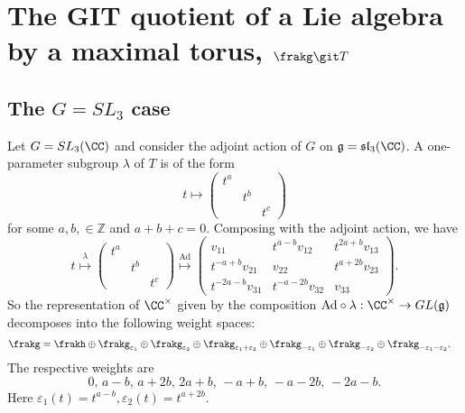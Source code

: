 \newpage
\section{The GIT quotient of a Lie algebra by a maximal torus, $\frakg \git T$}
\subsection{The $G=SL_3$ case}
Let $G = SL_3(\CC)$ and consider the adjoint action of $G$ on $\mathfrak{g} = \mathfrak{sl}_3(\CC)$.
A one-parameter subgroup $\lambda$ of $T$ is of the form
$$t \mapsto \begin{pmatrix} t^a & & \\ & t^b & \\ & & t^c \end{pmatrix}$$
for some $a, b, \in \mathbb{Z}$ and $a + b + c = 0$.
Composing with the adjoint action, we have
$$t 
\overset{\lambda}{\mapsto} \begin{pmatrix} t^a & & \\ & t^b & \\ & & t^c \end{pmatrix}
 \overset{\mathrm{Ad}}{\mapsto} \begin{pmatrix} v_{11} & t^{a-b} v_{12} & t^{2a+b} v_{13} \\ t^{-a+b} v_{21} & v_{22} & t^{a+2b} v_{23} \\ t^{-2a-b} v_{31} & t^{-a-2b} v_{32} & v_{33} \end{pmatrix}.$$
So the representation of $\CC^\times$ given by the composition $\mathrm{Ad} \circ \lambda: \CC^\times \to GL(\mathfrak{g})$ decomposes into the following weight spaces:
\begin{align*}
	\frakg &= \frakh \oplus \frakg_{\varepsilon_1} \oplus \frakg_{\varepsilon_2} \oplus \frakg_{\varepsilon_1 + \varepsilon_2} \oplus \frakg_{-\varepsilon_1} \oplus \frakg_{-\varepsilon_2} \oplus \frakg_{-\varepsilon_1 - \varepsilon_2}. 
\end{align*}
The respective weights are
$$0, \, a-b, \, a+2b, \, 2a+b, \, -a+b, \, -a-2b, \,-2a-b.$$
Here $\varepsilon_1(t) = t^{a-b}, \varepsilon_2(t) = t^{a+2b}$.

